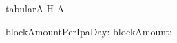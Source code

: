 \documentclass{report}
\begin{document}
\begin{table}[]
\begin{Timetable}{tabular}{A H A}

\end{Timetable}
\end{table}
blockAmountPerIpaDay: \blockAmountPerIpaDay
blockAmount: \blockAmount
\end{document}
